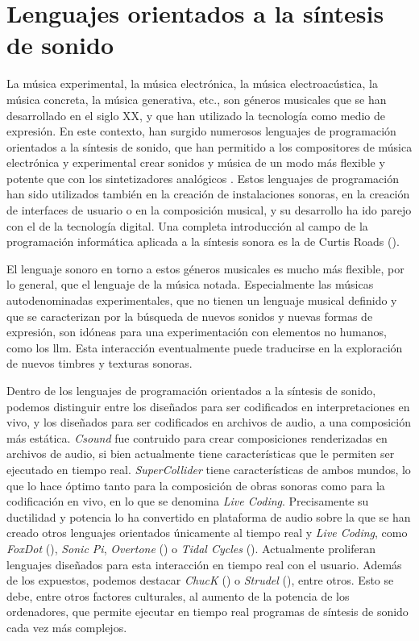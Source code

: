 \section{Lenguajes orientados a la síntesis de sonido}

La música experimental, la música electrónica, la música electroacústica, la música concreta, la música generativa, etc., son géneros musicales que se han desarrollado en el siglo XX, y que han utilizado la tecnología como medio de expresión. En este contexto, han surgido numerosos lenguajes de programación orientados a la síntesis de sonido, que han permitido a los compositores de música electrónica y experimental crear sonidos y música de un modo más flexible y potente que con los sintetizadores analógicos . Estos lenguajes de programación han sido utilizados también en la creación de instalaciones sonoras, en la creación de interfaces de usuario o en la composición musical, y su desarrollo ha ido parejo con el de la tecnología digital. Una completa introducción al campo de la programación informática aplicada a la síntesis sonora es la de Curtis Roads (\citeyear{roadsComputerMusicTutorial1996}).

El lenguaje sonoro en torno a estos géneros musicales es mucho más flexible, por lo general, que el lenguaje de la música notada. Especialmente las músicas autodenominadas experimentales, que no tienen un lenguaje musical definido y que se caracterizan por la búsqueda de nuevos sonidos y nuevas formas de expresión, son idóneas para una experimentación con elementos no humanos, como los \gls{llm}. Esta interacción eventualmente puede traducirse en la exploración de nuevos timbres y texturas sonoras.

Dentro de los lenguajes de programación orientados a la síntesis de sonido, podemos distinguir entre los diseñados para ser codificados en interpretaciones en vivo, y los diseñados para ser codificados en archivos de audio, a una composición más estática. \emph{Csound} \citep{boulangerCsoundBookPerspectives2000} fue contruido para crear composiciones renderizadas en archivos de audio, si bien actualmente tiene características que le permiten ser ejecutado en tiempo real. \emph{SuperCollider} \citep{wilsonSuperColliderBook2011a} tiene características de ambos mundos, lo que lo hace óptimo tanto para la composición de obras sonoras como para la codificación en vivo, en lo que se denomina \emph{Live Coding}. Precisamente su ductilidad y potencia lo ha convertido en plataforma de audio sobre la que se han creado otros lenguajes orientados únicamente al tiempo real y \emph{Live Coding}, como \emph{FoxDot} (\citeyear{kirkbrideQirkyFoxDot2023}), \emph{Sonic Pi}, \emph{Overtone} (\citeyear{OvertoneCollaborativeProgrammable}) o \emph{Tidal Cycles} (\citeyear{LiveCodeTidal}). Actualmente proliferan lenguajes diseñados para esta interacción en tiempo real con el usuario. Además de los expuestos, podemos destacar \emph{ChucK} (\citeyear{teamChucKStronglyTimedMusic}) o \emph{Strudel} (\citeyear{StrudelREPL}), entre otros. Esto se debe, entre otros factores culturales, al aumento de la potencia de los ordenadores, que permite ejecutar en tiempo real programas de síntesis de sonido cada vez más complejos.

